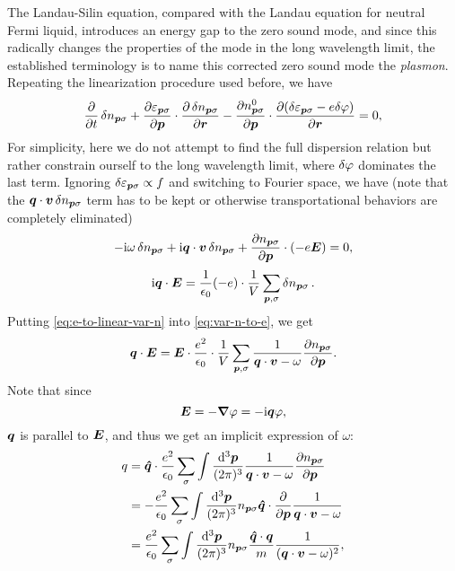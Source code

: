 \documentclass[hyperref, a4paper]{article}
\newcommand*{\ii}{\mathrm{i}}
\begin{document}
The Landau-Silin equation, compared with the Landau equation 
for neutral Fermi liquid, 
introduces an energy gap to the zero sound mode, 
and since this radically changes the properties of the mode 
in the long wavelength limit, 
the established terminology is to name 
this corrected zero sound mode the \emph{plasmon}.
Repeating the linearization procedure used before, we have
\begin{equation}
    \pdv{t} \var{n}_{\vb*{p} \sigma} 
    + \pdv{\varepsilon_{\vb*{p} \sigma}}{\vb*{p}} \cdot \pdv{\var{n}_{\vb*{p} \sigma}}{\vb*{r}}
    - \pdv{{n}^0_{\vb*{p} \sigma}}{\vb*{p}} \cdot \pdv{(\var \varepsilon_{\vb*{p} \sigma} - e \var \varphi)}{\vb*{r}} = 0,
\end{equation}
For simplicity, here we do not attempt to find the full dispersion relation 
but rather constrain ourself to the long wavelength limit, 
where $\var{\varphi}$ dominates the last term.
Ignoring $\var{\varepsilon}_{\vb*{p} \sigma} \propto f$ 
and switching to Fourier space, we have 
(note that the $\vb*{q} \cdot \vb*{v} \var{n}_{\vb*{p} \sigma}$ term 
has to be kept or otherwise transportational behaviors 
are completely eliminated)
\begin{equation}
    - \ii \omega \var{n_{\vb*{p} \sigma}} + \ii \vb*{q} \cdot \vb*{v} \var{n_{\vb*{p} \sigma}} + \pdv{{n}_{\vb*{p} \sigma}}{\vb*{p}} \cdot (- e \vb*{E}) = 0,
    \label{eq:e-to-linear-var-n}
\end{equation}
\begin{equation}
    \ii \vb*{q} \cdot \vb*{E} = \frac{1}{\epsilon_0} (-e) \cdot \frac{1}{V} \sum_{\vb*{p} , \sigma}
    \var{n}_{\vb*{p} \sigma}.
    \label{eq:var-n-to-e}
\end{equation}
Putting \eqref{eq:e-to-linear-var-n} into \eqref{eq:var-n-to-e}, we get 
\begin{equation}
    \vb*{q} \cdot \vb*{E} = \vb*{E}  \cdot \frac{e^2}{\epsilon_0} \cdot \frac{1}{V} \sum_{\vb*{p}, \sigma}
    \frac{1}{\vb*{q} \cdot \vb*{v} - \omega} \pdv{n_{\vb*{p} \sigma}}{\vb*{p}}.
\end{equation}
Note that since 
\[
    \vb*{E} = - \grad{\varphi} = - \ii \vb*{q} \varphi,
\]
$\vb*{q}$ is parallel to $\vb*{E}$, and thus we get 
an implicit expression of $\omega$:
\begin{equation}
    \begin{aligned}
        q &= \vu*{q} \cdot \frac{e^2}{\epsilon_0} \sum_\sigma \int \frac{\dd[3]{\vb*{p}}}{(2\pi)^3} 
        \frac{1}{\vb*{q} \cdot \vb*{v} - \omega} \pdv{n_{\vb*{p} \sigma}}{\vb*{p}} \\
        &= - \frac{e^2}{\epsilon_0} \sum_\sigma \int \frac{\dd[3]{\vb*{p}}}{(2\pi)^3} 
        n_{\vb*{p} \sigma}
        \vu*{q} \cdot \pdv{\vb*{p}} \frac{1}{\vb*{q} \cdot \vb*{v} - \omega} \\
        &= \frac{e^2}{\epsilon_0} \sum_\sigma \int \frac{\dd[3]{\vb*{p}}}{(2\pi)^3} 
        n_{\vb*{p} \sigma}
        \frac{\vu*{q} \cdot \vb*{q}}{m} \frac{1}{(\vb*{q} \cdot \vb*{v} - \omega)^2} ,
    \end{aligned}
\end{equation}
\end{document}
